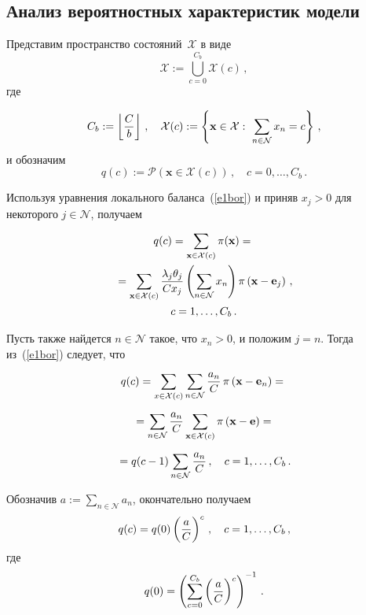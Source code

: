 \begin{multicols}{2}
\vspace*{-2pt}
  
  \section{Анализ вероятностных характеристик модели}
  
  Представим пространство состояний~${\mathcal X}$ в виде 
  $$
  {\mathcal X} :=  \bigcup\limits_{c=0}^{C_b} {\mathcal X}(c)\,,
  $$ 
  где 
  
  \noindent
  $$
  C_b := \left\lfloor \displaystyle\frac{\displaystyle C\mathstrut}{\displaystyle b\mathstrut}\right\rfloor\,,\quad {\mathcal X}(c) :=  \left\{ 
\mathbf{x}\in {\mathcal X}:\ \sum\limits_{n\in {\mathcal N}} x_n=c\right\}\,,
$$ 
и обозначим 
$$
q(c) :=  {\mathcal P} (\mathbf{x} \in{\mathcal X}(c))\,,\quad c=0,\ldots ,C_b\,.
$$

Используя уравнения 
локального баланса~(\ref{e1bor}) и приняв $x_j>0$ для некоторого $j\in {\mathcal N}$, получаем

\noindent
  \begin{multline*}
  q(c) =\sum\limits_{\mathbf{x}\in {\mathcal X}(c)} \pi (\mathbf{x}) = {}\\
  {}=
\sum\limits_{\mathbf{x}\in {\mathcal X} (c)} \displaystyle\frac{\displaystyle \lambda_j\theta_j\mathstrut}{\displaystyle Cx_j\mathstrut}\left ( 
\sum\limits_{n\in {\mathcal N}} x_n\right )\pi \left ( \mathbf{x}-\mathbf{e}_j\right 
)\,, \\ c=1,\ldots ,C_b\,.
  \end{multline*}

Пусть также найдется $n\in{\mathcal N}$ такое, что $x_n >0$, и положим $j=n$. Тогда 
из~(\ref{e1bor}) следует, что
\begin{multline*}
q(c) = \sum\limits_{x\in{\mathcal X}(c)} \sum\limits_{n\in{\mathcal N}} \displaystyle\frac{\displaystyle a_n\mathstrut}{\displaystyle C\mathstrut}\,\pi \left (\mathbf{x} -\mathbf{e}_n\right )
={}\\[3pt]
{}=\sum\limits_{n\in {\mathcal N}} \displaystyle\frac{\displaystyle a_n\mathstrut}{\displaystyle C\mathstrut}\sum\limits_{\mathbf{x}\in {\mathcal X}(c)}\pi\left (
\mathbf{x}-\mathbf{e}\right ) ={}\\[3pt]
{}= q(c-1)\sum\limits_{n\in {\mathcal N}}\displaystyle\frac{\displaystyle a_n\mathstrut}{\displaystyle C\mathstrut}\,,\quad c=1,\ldots ,C_b\,.
\end{multline*}
     
  Обозначив $a := \sum\limits_{n\in {\mathcal N}} a_n$, окончательно получаем
  \begin{equation}
  q(c) = q(0) \left (\displaystyle\frac{\displaystyle a\mathstrut}{\displaystyle C\mathstrut}\right )^c\,, \quad c=1,\ldots ,C_b\,,
  \label{e2bor}
  \end{equation}
где
\begin{equation}
q(0) =  \left ( \sum\limits_{c=0}^{C_b} \left (\displaystyle\frac{\displaystyle a\mathstrut}{\displaystyle C\mathstrut}\right )^c\right )^{-1}\,.
\label{e3bor}
\end{equation}
  

\end{multicols}
